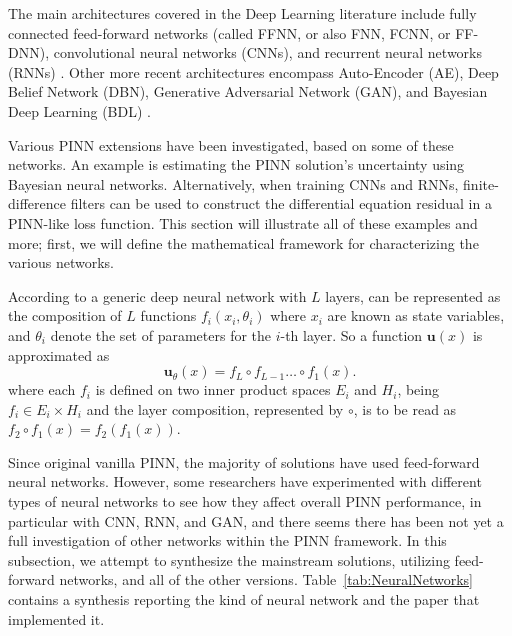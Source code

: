 \documentclass[pdflatex,sn-basic]{sn-jnl}%
\theoremstyle{thmstyleone}%
\theoremstyle{thmstyletwo}%
\theoremstyle{thmstylethree}%
\begin{document}
The main architectures covered in the Deep Learning  literature include fully connected feed-forward networks (called FFNN, or also FNN, FCNN, or FF-DNN), convolutional neural networks (CNNs), and recurrent neural networks (RNNs) \citep{LeC2015_DeepLearning_BenLBH, Che2018_RiseDeepLearning_EngCEW}.
Other more recent architectures encompass Auto-Encoder (AE), Deep Belief Network (DBN), Generative Adversarial Network (GAN), and Bayesian Deep Learning (BDL) \citep{Alo2019_StateArtSurvey_TahATY, Ber2019_SurveyDeepLearning_BucBBCC}.%


Various PINN extensions have been investigated, based on some of these networks. An example is estimating the PINN solution's uncertainty using Bayesian neural networks. Alternatively, when training CNNs and RNNs, finite-difference filters can be used to construct the differential equation residual in a PINN-like loss function. 
This section will illustrate all of these examples and more; first, we will define the mathematical framework for characterizing the various networks. 


According to 
\cite{Cat2018_GenericRepresentationNeural_ChaCC}
a generic deep neural network with $L$ layers, can be represented  as the composition of $L$ functions $f_i(x_i,\theta_i)$  where $x_i$ are known as state variables, and
 $\theta_i$ denote the set of parameters for the $i$-th layer. So a function $\bm{u}(x)$ is approximated as
\begin{equation}
\label{eq:dnn}
\bm{u}_{\theta}(x) = f_L \circ f_{L-1}  \ldots   \circ f_1(x).
\end{equation} 
where
each $f_i$ is defined on two inner product spaces $E_i$ and $H_i$, being $f_i\in E_i \times H_i$
and 
the layer composition, represented  by $\circ$, 
is to be read as $f_2 \circ f_1 (x) = f_2(f_1(x))$.





Since \cite{Rai2019_PhysicsInformedNeural_PerRPK} original vanilla PINN, the majority of solutions have used feed-forward neural networks. %
However, some researchers have experimented with different types of neural networks to see how they affect overall PINN performance, in particular with CNN, RNN, and GAN, and there seems there has been not yet a full investigation of other networks within the PINN framework.
In this subsection, we attempt to synthesize the mainstream solutions, utilizing feed-forward networks, and all of the other versions. 
%
Table~\ref{tab:NeuralNetworks} contains a synthesis reporting the kind of neural network and the paper that implemented it. 
\end{document}
